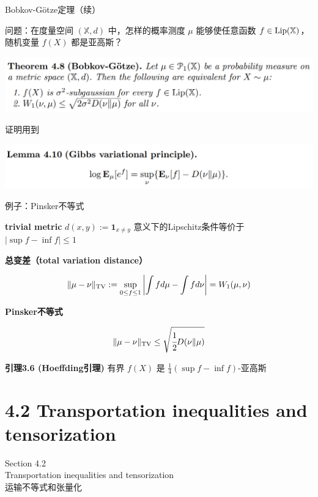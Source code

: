 \documentclass{beamer}
\begin{document}
\begin{frame}{Bobkov-G{\"o}tze定理（续）}

问题：在度量空间 $(\mathbb{X}, d)$ 中，怎样的概率测度 $\mu$ 能够使任意函数 $f\in{\rm Lip}(\mathbb{X})$，随机变量 $f(X)$ 都是亚高斯？

\begin{center}
\includegraphics[width=1.0\textwidth, frame]{figures/4-8-thm.png}
\end{center}

证明用到

\begin{center}
\includegraphics[width=1.0\textwidth, frame]{figures/4-10-lemma.png}
\end{center}

\end{frame}

\begin{frame}{例子：Pinsker不等式}

\textbf{trivial metric} $d(x, y) := \mathbf{1}_{x\neq y}$ 意义下的Lipschitz条件等价于 $|\sup f - \inf f| \le 1$

\textbf{总变差（total variation distance）}

$$
\|\mu-\nu\|_{\rm TV} := \sup_{0\le f\le 1} \left|\int fd\mu - \int fd\nu\right| = W_1(\mu, \nu)
$$

\textbf{Pinsker不等式}

$$
\|\mu-\nu\|_{\rm TV} \le \sqrt{\cfrac{1}{2}D(\nu\|\mu)}
$$

\textbf{引理3.6 (Hoeffding引理)} 有界 $f(X)$ 是 $\frac{1}{4}(\sup f - \inf f)$-亚高斯
    
\end{frame}

\section{4.2 Transportation inequalities and tensorization}

\begin{frame}
\begin{center}
\Large Section 4.2 \\ Transportation inequalities and tensorization \\ 运输不等式和张量化
\end{center}
\end{frame}
\end{document}
